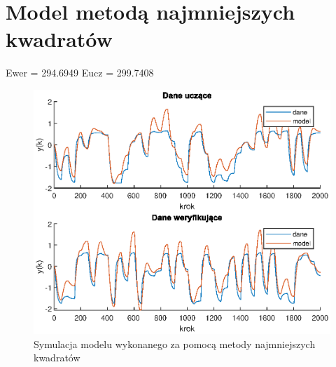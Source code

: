 		\newpage
	\section{Model metodą najmniejszych kwadratów}
		\label{sec:mnk}
		Ewer = 294.6949
		Eucz = 299.7408
		
		\begin{figure}[h!]
			\centering
			\includegraphics[width=\linewidth]{img/mnk.eps}
			\caption{Symulacja modelu wykonanego za pomocą metody najmniejszych kwadratów}
			\label{fig:mnk}
		\end{figure}